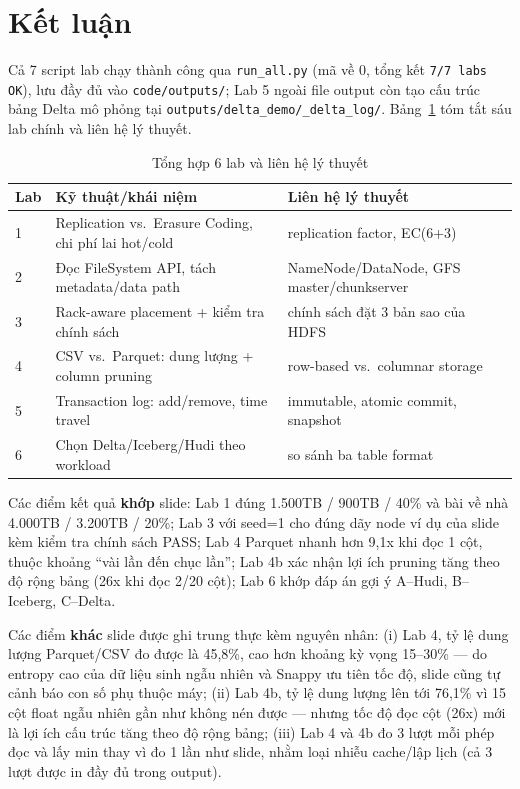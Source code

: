 \documentclass[12pt,a4paper,oneside]{article}
\begin{document}
\section{Kết luận}

Cả 7 script lab chạy thành công qua \texttt{run\_all.py} (mã về 0, tổng kết \texttt{7/7 labs OK}), lưu đầy đủ vào \texttt{code/outputs/}; Lab 5 ngoài file output còn tạo cấu trúc bảng Delta mô phỏng tại \texttt{outputs/delta\_demo/\_delta\_log/}. Bảng~\ref{tab:tonghop} tóm tắt sáu lab chính và liên hệ lý thuyết.

\begin{table}[H]
\centering
\caption{Tổng hợp 6 lab và liên hệ lý thuyết}
\label{tab:tonghop}
\begin{tabularx}{\textwidth}{l X X}
\toprule
Lab & Kỹ thuật/khái niệm & Liên hệ lý thuyết \\
\midrule
1 & Replication vs.\ Erasure Coding, chi phí lai hot/cold & replication factor, EC(6+3) \\
2 & Đọc FileSystem API, tách metadata/data path & NameNode/DataNode, GFS master/chunkserver \\
3 & Rack-aware placement + kiểm tra chính sách & chính sách đặt 3 bản sao của HDFS \\
4 & CSV vs.\ Parquet: dung lượng + column pruning & row-based vs.\ columnar storage \\
5 & Transaction log: add/remove, time travel & immutable, atomic commit, snapshot \\
6 & Chọn Delta/Iceberg/Hudi theo workload & so sánh ba table format \\
\bottomrule
\end{tabularx}
\end{table}

Các điểm kết quả \textbf{khớp} slide: Lab 1 đúng 1.500TB / 900TB / 40\% và bài về nhà 4.000TB / 3.200TB / 20\%; Lab 3 với seed=1 cho đúng dãy node ví dụ của slide kèm kiểm tra chính sách PASS; Lab 4 Parquet nhanh hơn 9,1x khi đọc 1 cột, thuộc khoảng ``vài lần đến chục lần''; Lab 4b xác nhận lợi ích pruning tăng theo độ rộng bảng (26x khi đọc 2/20 cột); Lab 6 khớp đáp án gợi ý A--Hudi, B--Iceberg, C--Delta.

Các điểm \textbf{khác} slide được ghi trung thực kèm nguyên nhân: (i) Lab 4, tỷ lệ dung lượng Parquet/CSV đo được là 45,8\%, cao hơn khoảng kỳ vọng 15--30\% --- do entropy cao của dữ liệu sinh ngẫu nhiên và Snappy ưu tiên tốc độ, slide cũng tự cảnh báo con số phụ thuộc máy; (ii) Lab 4b, tỷ lệ dung lượng lên tới 76,1\% vì 15 cột float ngẫu nhiên gần như không nén được --- nhưng tốc độ đọc cột (26x) mới là lợi ích cấu trúc tăng theo độ rộng bảng; (iii) Lab 4 và 4b đo 3 lượt mỗi phép đọc và lấy min thay vì đo 1 lần như slide, nhằm loại nhiễu cache/lập lịch (cả 3 lượt được in đầy đủ trong output).
\end{document}
